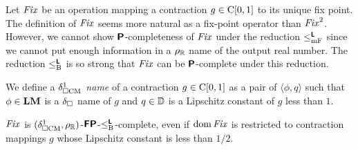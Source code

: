 \documentclass[envcountsame,orivec,oribibl]{llncs}
\begin{document}
Let $\mathit{Fix}$ be an operation mapping a contraction $g \in \mathrm C[0,1]$ 
to its unique fix point.
The definition of $\mathit{Fix}$ seems more natural as a fix-point operator than
$\mathit{Fix}^2$.
However, we cannot show $\text{\bfseries \sffamily \upshape P}$-completeness of $\mathit{Fix}$ 
under the reduction $\leq _{\mathrm{mF}} ^{\text{\bfseries \sffamily \upshape L}}$ since we cannot put enough information in
 a $\rho _\mathbb R$ name of the output real number.
The reduction $\leq _{\mathrm B} ^{\text{\bfseries \sffamily \upshape L}}$ is so strong that $\mathit{Fix}$ can 
be $\text{\bfseries \sffamily \upshape P}$-complete under this reduction.

We define a \emph{$\delta _{\square \mathrm{CM}}^1$ name} of a contraction $g \in \mathrm C[0,1]$
as a pair of $\langle \phi, q \rangle$ such that $\phi \in \mathbf{LM}$ is a 
$\delta _\square$ name of $g$ and $q \in \mathbb D$ is a Lipschitz constant of $g$ less than $1$.
\begin{lemma}
\label{lemma:P-hard-g_u}
$\mathit{Fix}$ is $(\delta _{\square \mathrm{CM}}^1, \rho _\mathbb R)$-$\text{\bfseries \sffamily \upshape FP}$-$\leq _{\mathrm B} ^{\text{\bfseries \sffamily \upshape L}}$-complete, 
 even if $\mathop{\rm dom} \mathit{Fix}$ is restricted to contraction mappings
$g$ whose Lipschitz constant is less than $1/2$.
\end{lemma}
\end{document}

